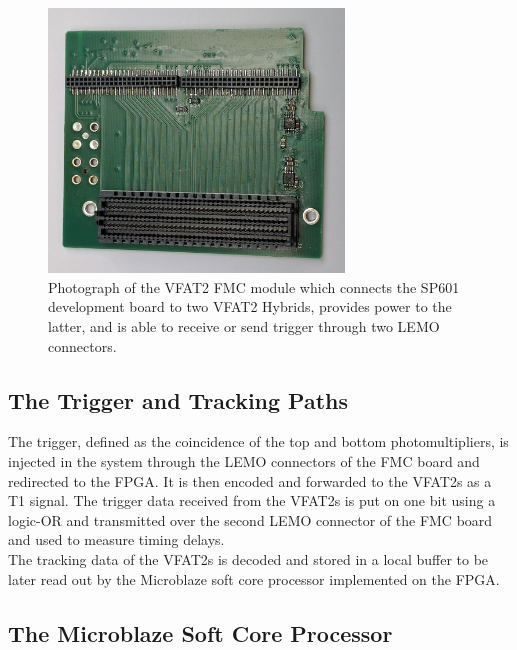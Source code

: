       \begin{figure}[b!]
        \centering
        \includegraphics[width=0.7\textwidth]{img/III-1-arch/fmc.jpg}
        \caption{Photograph of the VFAT2 FMC module which connects the SP601 development board to two VFAT2 Hybrids, provides power to the latter, and is able to receive or send trigger through two LEMO connectors.}
        \label{fig:III-1-fmc}
      \end{figure}

    \subsection{The Trigger and Tracking Paths}

      The trigger, defined as the coincidence of the top and bottom photomultipliers, is injected in the system through the LEMO connectors of the FMC board and redirected to the FPGA. It is then encoded and forwarded to the VFAT2s as a T1 signal. The trigger data received from the VFAT2s is put on one bit using a logic-OR and transmitted over the second LEMO connector of the FMC board and used to measure timing delays. \\

      The tracking data of the VFAT2s is decoded and stored in a local buffer to be later read out by the Microblaze soft core processor implemented on the FPGA.

    \subsection{The Microblaze Soft Core Processor}


